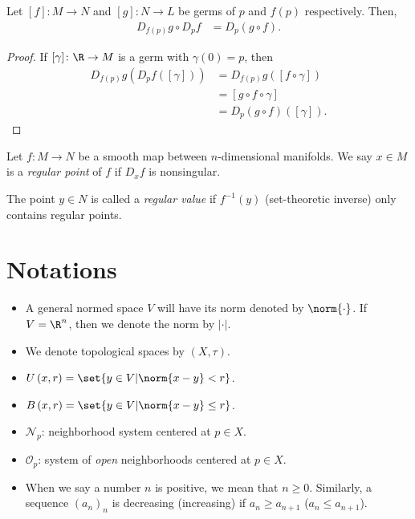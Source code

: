 \documentclass[10pt]{mypackage}
\begin{document}
\begin{theorem}
  Let $ [f]\colon M\rightarrow N $ and $ [g]\colon N\rightarrow L $ be germs of $p$ and $f(p)$ respectively. Then,
  \begin{align*}
    D_{f(p)}g\circ D_pf &= D_{p}\left( g\circ f \right).
  \end{align*}
\end{theorem}
\begin{proof}
  If $[\gamma]\colon \R\rightarrow M$ is a germ with $\gamma(0) = p$, then
  \begin{align*}
    D_{f(p)}g\left( D_{p}f\left( \left[ \gamma \right] \right) \right) &= D_{f(p)}g\left( \left[ f\circ \gamma \right] \right)\\
                                                                       &= \left[ g\circ f \circ \gamma \right]\\
                                                                       &= D_{p}\left( g\circ f \right)\left( \left[ \gamma \right] \right).
  \end{align*}
\end{proof}
\begin{definition}
  Let $f\colon M\rightarrow N$ be a smooth map between $n$-dimensional manifolds. We say $x\in M$ is a \textit{regular point} of $f$ if $D_{x}f$ is nonsingular.\newline

  The point $y\in N$ is called a \textit{regular value} if $f^{-1}\left( y \right)$ (set-theoretic inverse) only contains regular points.
\end{definition}

\section{Notations}%
\begin{itemize}
  \item A general normed space $V$ will have its norm denoted by $\norm{\cdot}$. If $V = \R^{n}$, then we denote the norm by $ \left\vert \cdot \right\vert $.
  \item We denote topological spaces by $\left( X,\tau \right)$.
  \item $ U\left( x,r \right) = \set{y\in V | \norm{x-y} < r}$.
  \item $ B\left( x,r \right) = \set{y\in V | \norm{x-y} \leq r}$.
  \item $ \mathcal{N}_p $: neighborhood system centered at $p\in X$.
  \item $ \mathcal{O}_p $: system of \textit{open} neighborhoods centered at $p\in X$.
  \item When we say a number $n$ is positive, we mean that $n\geq 0$. Similarly, a sequence $\left( a_n \right)_n$ is decreasing (increasing) if $a_n\geq a_{n+1}$ ($a_n\leq a_{n+1}$).
\end{itemize}
\end{document}

